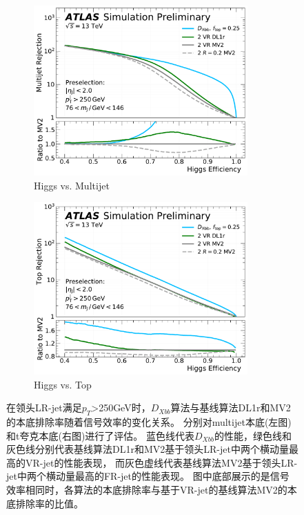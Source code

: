 \begin{figure}[!thbp]
  \begin{subfigure}{.5\textwidth}
  \centering
  \includegraphics[width=0.9\textwidth]{figuresXbb/pulled/roc/250_inf/zoom/dijet.pdf}
  \caption{Higgs vs. Multijet}
  \end{subfigure}
  \begin{subfigure}{.5\textwidth}
  \centering
  \includegraphics[width=0.9\textwidth]{figuresXbb/pulled/roc/250_inf/top.pdf}
  \caption{Higgs vs. Top}
  \end{subfigure}
  \caption{
在领头LR-jet满足$p_{T}$>250GeV时，$D_{Xbb}$算法与基线算法DL1r和MV2的本底排除率随着信号效率的变化关系。
分别对multijet本底(左图)和t夸克本底(右图)进行了评估。
蓝色线代表$D_{Xbb}$的性能，绿色线和灰色线分别代表基线算法DL1r和MV2基于领头LR-jet中两个横动量最高的VR-jet的性能表现，
而灰色虚线代表基线算法MV2基于领头LR-jet中两个横动量最高的FR-jet的性能表现。
图中底部展示的是信号效率相同时，各算法的本底排除率与基于VR-jet的基线算法MV2的本底排除率的比值。
 }
\label{fig:roc250}
\end{figure}

